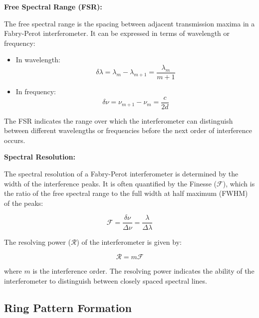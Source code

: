 \documentclass[
  a4paper,
]{book}
\begin{document}
\begin{tcolorbox}[enhanced jigsaw, breakable, toptitle=1mm, bottomrule=.15mm, colbacktitle=quarto-callout-note-color!10!white, title=\textcolor{quarto-callout-note-color}{\faInfo}\hspace{0.5em}{Free Spectral Range and Spectral Resolution}, arc=.35mm, rightrule=.15mm, bottomtitle=1mm, opacityback=0, toprule=.15mm, coltitle=black, leftrule=.75mm, opacitybacktitle=0.6, colback=white, left=2mm, titlerule=0mm, colframe=quarto-callout-note-color-frame]

\textbf{Free Spectral Range (FSR):}

The free spectral range is the spacing between adjacent transmission
maxima in a Fabry-Perot interferometer. It can be expressed in terms of
wavelength or frequency:

\begin{itemize}
\item
  In wavelength: \[
  \delta \lambda = \lambda_{m} - \lambda_{m+1} = \frac{\lambda_m}{m+1}
  \]
\item
  In frequency: \[
  \delta \nu = \nu_{m+1} - \nu_m = \frac{c}{2d}
  \]
\end{itemize}

The FSR indicates the range over which the interferometer can
distinguish between different wavelengths or frequencies before the next
order of interference occurs.

\textbf{Spectral Resolution:}

The spectral resolution of a Fabry-Perot interferometer is determined by
the width of the interference peaks. It is often quantified by the
Finesse (\(\mathcal{F}\)), which is the ratio of the free spectral range
to the full width at half maximum (FWHM) of the peaks:

\[
\mathcal{F} = \frac{\delta \nu}{\Delta \nu} = \frac{\lambda}{\Delta \lambda}
\]

The resolving power (\(\mathcal{R}\)) of the interferometer is given by:

\[
\mathcal{R} = m \mathcal{F}
\]

where \(m\) is the interference order. The resolving power indicates the
ability of the interferometer to distinguish between closely spaced
spectral lines.

\end{tcolorbox}

\subsection{Ring Pattern Formation}\label{ring-pattern-formation}
\end{document}
